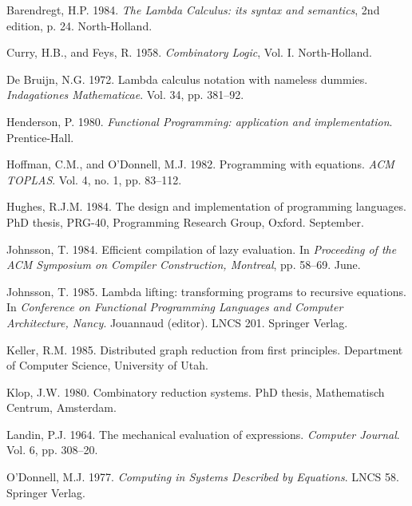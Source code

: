     \begin{references}

    \item Barendregt, H.P. 1984. \textit{The Lambda Calculus: its syntax and semantics}, 2nd edition, p.
    24. North-Holland.

    \item Curry, H.B., and Feys, R. 1958. \textit{Combinatory Logic}, Vol. I. North-Holland.

    \item De Bruijn, N.G. 1972. Lambda calculus notation with nameless dummies.
    \textit{Indagationes Mathematicae}. Vol. 34, pp. 381--92.

    \item Henderson, P. 1980. \textit{Functional Programming: application and implementation}.
    Prentice-Hall.

    \item Hoffman, C.M., and O'Donnell, M.J. 1982. Programming with equations. \textit{ACM
        TOPLAS}. Vol. 4, no. 1, pp. 83--112.

    \item Hughes, R.J.M. 1984. The design and implementation of programming languages.
    PhD thesis, PRG-40, Programming Research Group, Oxford. September.

    \item Johnsson, T. 1984. Efficient compilation of lazy evaluation. In \textit{Proceeding of the ACM
        Symposium on Compiler Construction, Montreal}, pp. 58--69. June.

    \item Johnsson, T. 1985. Lambda lifting: transforming programs to recursive equations. In
    \textit{Conference on Functional Programming Languages and Computer Architecture,
        Nancy}. Jouannaud (editor). LNCS 201. Springer Verlag.

    \item Keller, R.M. 1985. Distributed graph reduction from first principles. Department of
    Computer Science, University of Utah.

    \item Klop, J.W. 1980. Combinatory reduction systems. PhD thesis, Mathematisch
    Centrum, Amsterdam.

    \item Landin, P.J. 1964. The mechanical evaluation of expressions. \textit{Computer Journal}. Vol.
    6, pp. 308--20.

    \item O'Donnell, M.J. 1977. \textit{Computing in Systems Described by Equations}. LNCS 58.
    Springer Verlag.

    \end{references}